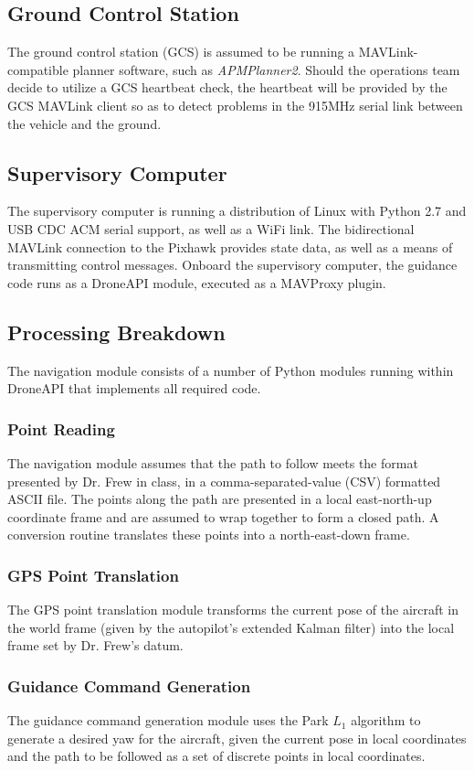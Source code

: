 \documentclass{aiaa}
\begin{document}
\subsection{Ground Control Station}
The ground control station (GCS) is assumed to be running a MAVLink-compatible planner software, such as \textit{APMPlanner2}. Should the operations team decide to utilize a GCS heartbeat check, the heartbeat will be provided by the GCS MAVLink client so as to detect problems in the 915MHz serial link between the vehicle and the ground. 
\subsection{Supervisory Computer}
The supervisory computer is running a distribution of Linux with Python 2.7 and USB CDC ACM serial support, as well as a WiFi link. The bidirectional MAVLink connection to the Pixhawk provides state data, as well as a means of transmitting control messages. Onboard the supervisory computer, the guidance code runs as a DroneAPI module, executed as a MAVProxy plugin.

\subsection{Processing Breakdown}
The navigation module consists of a number of Python modules running within DroneAPI that implements all required code. 
\subsubsection{Point Reading}
The navigation module assumes that the path to follow meets the format presented by Dr. Frew in class, in a comma-separated-value (CSV) formatted ASCII file. The points along the path are presented in a local east-north-up coordinate frame and are assumed to wrap together to form a closed path. A conversion routine translates these points into a north-east-down frame.
\subsubsection{GPS Point Translation}
The GPS point translation module transforms the current pose of the aircraft in the world frame (given by the autopilot's extended Kalman filter) into the local frame set by Dr. Frew's datum.
  
\subsubsection{Guidance Command Generation}
The guidance command generation module uses the Park $L_1$ algorithm to generate a desired yaw for the aircraft, given the current pose in local coordinates and the path to be followed as a set of discrete points in local coordinates.
\end{document}
